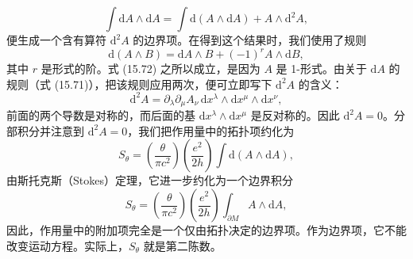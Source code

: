 \begin{equation*}
\int\mathrm{d}A\wedge\mathrm{d}A=\int\mathrm{d}(A\wedge\mathrm{d}A)+A\wedge\mathrm{d}^{2}A,\tag{15.72}
\end{equation*}
便生成一个含有算符 $\mathrm{d}^{2}A$ 的边界项。在得到这个结果时，我们使用了规则
\begin{equation*}
\mathrm{d}(A\wedge B)=\mathrm{d}A\wedge B+(-1)^{r}A\wedge\mathrm{d}B,\tag{15.73}
\end{equation*}
其中 $r$ 是形式的阶。式 (15.72) 之所以成立，是因为 $A$ 是 1-形式。由关于 $\mathrm{d}A$ 的规则（式 (15.71)），把该规则应用两次，便可立即写下 $\mathrm{d}^{2}A$ 的含义：
\begin{equation*}
\mathrm{d}^{2}A=\partial_{\lambda}\partial_{\mu}A_{\nu}\,\mathrm{d}x^{\lambda}\wedge\mathrm{d}x^{\mu}\wedge\mathrm{d}x^{\nu},\tag{15.74}
\end{equation*}
前面的两个导数是对称的，而后面的基 $\mathrm{d}x^{\lambda}\wedge\mathrm{d}x^{\mu}$ 是反对称的。因此 $\mathrm{d}^{2}A=0$。分部积分并注意到 $\mathrm{d}^{2}A=0$，我们把作用量中的拓扑项约化为
\begin{equation*}
S_{\theta}=\left(\frac{\theta}{\pi c^{2}}\right)\left(\frac{e^{2}}{2h}\right)\int\mathrm{d}(A\wedge\mathrm{d}A),\tag{15.75}
\end{equation*}
由斯托克斯（Stokes）定理，它进一步约化为一个边界积分
\begin{equation*}
S_{\theta}=\left(\frac{\theta}{\pi c^{2}}\right)\left(\frac{e^{2}}{2h}\right)\int_{\partial M}A\wedge\mathrm{d}A,\tag{15.76}
\end{equation*}
因此，作用量中的附加项完全是一个仅由拓扑决定的边界项。作为边界项，它不能改变运动方程。实际上，$S_{\theta}$ 就是第二陈数。

